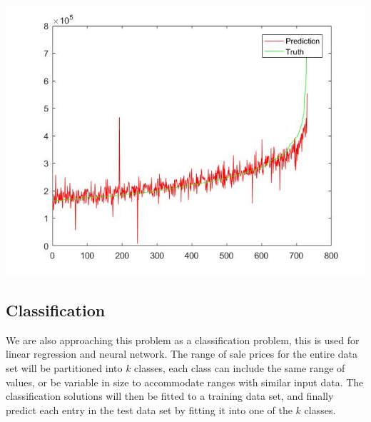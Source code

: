 \documentclass[10pt]{article}
\begin{document}
\begin{multicols}{2}
		\begin{center}
            \captionsetup{type=figure}
			\includegraphics[scale=0.35]{Images/linearRegression} \\
			\label{fig:linr_predictions}
		\end{center}
		\par
		\subsection{Classification}
			We are also approaching this problem as a classification problem, this is used for linear regression and neural network. The range of sale prices for the entire data set will be partitioned into \(k\) classes, each class can include the same range of values, or be variable in size to accommodate ranges with similar input data. The classification solutions will then be fitted to a training data set, and finally predict each entry in the test data set by fitting it into one of the \(k\) classes.

\end{multicols}
\end{document}
